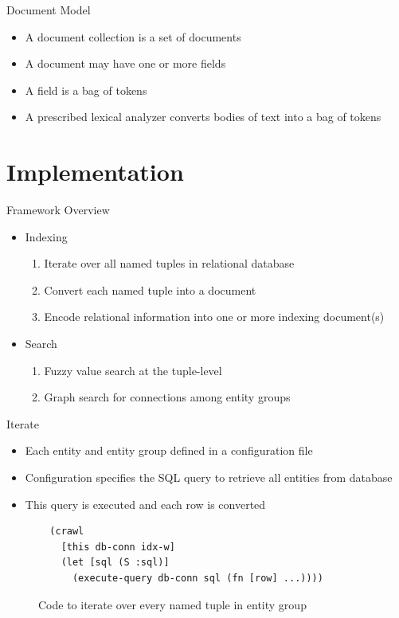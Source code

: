 \documentclass[compress]{beamer}
\begin{document}
		\begin{frame}{Document Model}
			\begin{itemize}
				\item A \alert{document collection} is a set of documents
				\item A \alert{document} may have one or more fields
				\item A \alert{field} is a bag of tokens
				\item A prescribed lexical \alert{analyzer} converts bodies of text into a bag of \alert{tokens}
			\end{itemize}
		\end{frame}
	
	\section{Implementation}
		\begin{frame}{Framework Overview}
			\begin{itemize}
				\item Indexing
					\begin{enumerate}
						\item \alert{Iterate} over all named tuples in relational database
						\item \alert{Convert} each named tuple into a document
						\item \alert{Encode} relational information into one or more \alert{indexing document(s)}
					\end{enumerate}
				\item Search
					\begin{enumerate}
						\item \alert{Fuzzy value search} at the tuple-level
						\item \alert{Graph search} for connections among entity groups
					\end{enumerate}
			\end{itemize}
		\end{frame}
		
		\begin{frame}[fragile]{Iterate}
			\begin{itemize}
				\item Each entity and entity group defined in a configuration file
				\item Configuration specifies the SQL query to retrieve all entities from database
				\item This query is executed and each row is converted
			\end{itemize}
			
			\begin{figure}
				\begin{verbatim}
  (crawl
    [this db-conn idx-w]
    (let [sql (S :sql)]
      (execute-query db-conn sql (fn [row] ...))))
				\end{verbatim}
				\caption{Code to iterate over every named tuple in entity group}
				\label{lst:crawl}
			\end{figure}
		\end{frame}
		
\end{document}
